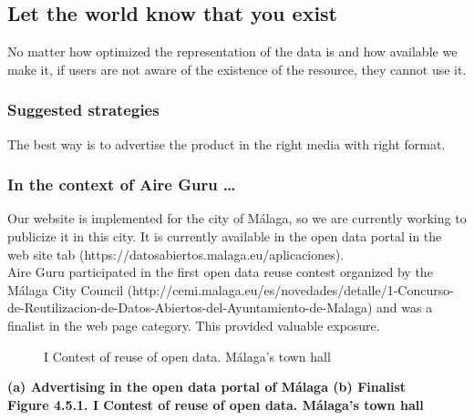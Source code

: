 \subsection{Let the world know that you exist}

No matter how optimized the representation of the data is and how available we make it, if users are not aware
of the existence of the resource, they cannot use it.

\subsubsection*{Suggested strategies} 

The best way is to advertise the product in the right media with right format.

\subsubsection*{In the context of Aire Guru \ldots}

Our website is implemented for the city of Málaga, so we are currently working to publicize it in this city.
It is currently available in the open data portal in the web site tab (https://datosabiertos.malaga.eu/aplicaciones). \\

Aire Guru participated in the first open data reuse contest organized by the Málaga City Council (http://cemi.malaga.eu/es/novedades/detalle/1-Concurso-de-Reutilizacion-de-Datos-Abiertos-del-Ayuntamiento-de-Malaga)
and was a finalist in the web page category. This provided valuable exposure.

\begin{figure}[ht]
    \centering
    \hfill
    \caption{I Contest of reuse of open data. Málaga's town hall}
\end{figure}

\begin{center}
    \bf{ (a) Advertising in the open data portal of Málaga     (b) Finalist   \\
    Figure 4.5.1. I Contest of reuse of open data. Málaga's town hall}
\end{center}